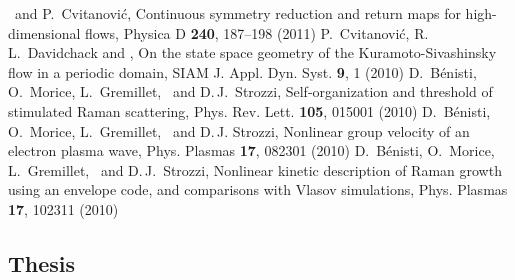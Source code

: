 	{\siminos\ and  P.~Cvitanovi\'c,
 	{\emtitle Continuous symmetry reduction and return maps for high-dimensional flows,}
 	{\emjournal Physica D} \textbf{240}, 187--198 (2011)
	}
	{P.~Cvitanovi\'c, R.\,L.~Davidchack and \siminos,
 	{\emtitle On the state space geometry of the Kuramoto-Sivashinsky flow in a periodic domain,}
 	{\emjournal SIAM J. Appl. Dyn. Syst.} \textbf{9}, 1 (2010)
	}
	{D.~B\'enisti, O.~Morice, L.~Gremillet, \siminos\ and D.\,J.~Strozzi,
	{\emtitle Self-organization and threshold of stimulated Raman scattering,}
	{\emjournal Phys. Rev. Lett.} \textbf{105}, 015001 (2010)
	}
	{D.~B\'enisti, O.~Morice, L.~Gremillet, \siminos\ and D.\,J. Strozzi,
	{\emtitle Nonlinear group velocity of an electron plasma wave,}
	{\emjournal Phys. Plasmas} \textbf{17}, 082301 (2010)
	}
	{D.~B\'enisti, O.~Morice, L.~Gremillet, \siminos\ and D.\,J.~Strozzi,
	{\emtitle Nonlinear kinetic description of Raman growth using an envelope code, and comparisons with Vlasov simulations,}
	{\emjournal Phys. Plasmas} \textbf{17}, 102311 (2010)
	}
\subsection{Thesis}
